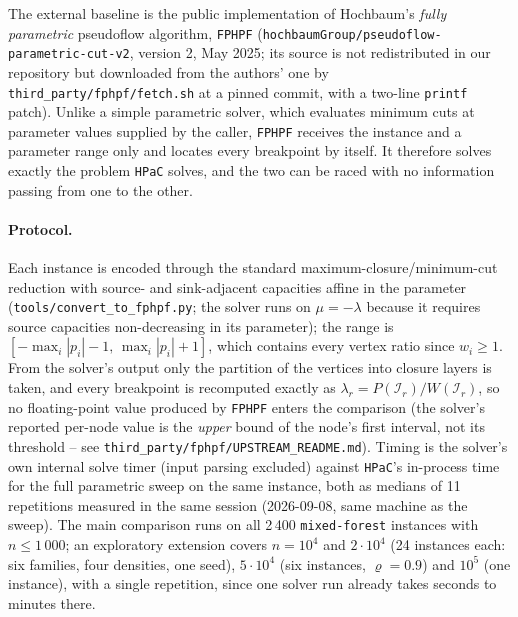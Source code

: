 \documentclass[11pt]{article}
\begin{document}
The external baseline is the public implementation of Hochbaum's \emph{fully
parametric} pseudoflow algorithm, \texttt{FPHPF}
(\texttt{hochbaumGroup/pseudoflow-parametric-cut-v2}, version 2, May 2025; its
source is not redistributed in our repository but downloaded from the authors'
one by \texttt{third\_party/fphpf/fetch.sh} at a pinned commit, with a two-line
\texttt{printf} patch). Unlike a simple parametric solver, which evaluates
minimum cuts at parameter values supplied by the caller, \texttt{FPHPF}
receives the instance and a parameter range only and locates every breakpoint
by itself. It therefore solves exactly the problem \texttt{HPaC} solves, and the
two can be raced with no information passing from one to the other.

\paragraph{Protocol.} Each instance is encoded through the standard
maximum-closure/minimum-cut reduction with source- and sink-adjacent capacities
affine in the parameter (\texttt{tools/convert\_to\_fphpf.py}; the solver runs
on $\mu=-\lambda$ because it requires source capacities non-decreasing in its
parameter); the range is $[-\max_i|p_i|-1,\,\max_i|p_i|+1]$, which contains
every vertex ratio since $w_i\ge1$. From the solver's output only the partition
of the vertices into closure layers is taken, and every breakpoint is recomputed
exactly as $\lambda_r=P(\mathcal I_r)/W(\mathcal I_r)$, so no floating-point
value produced by \texttt{FPHPF} enters the comparison (the solver's reported
per-node value is the \emph{upper} bound of the node's first interval, not its
threshold -- see \texttt{third\_party/fphpf/UPSTREAM\_README.md}). Timing is the
solver's own internal solve timer (input parsing excluded) against
\texttt{HPaC}'s in-process time for the full parametric sweep on the same
instance, both as medians of 11 repetitions measured in the same session
(2026-09-08, same machine as the sweep). The main comparison runs on all 2\,400
\texttt{mixed-forest} instances with $n\le1\,000$; an exploratory extension
covers $n=10^4$ and $2\cdot10^4$ (24 instances each: six families, four
densities, one seed), $5\cdot10^4$ (six instances, $\varrho=0.9$) and $10^5$
(one instance), with a single repetition, since one solver run already takes
seconds to minutes there.
\end{document}
